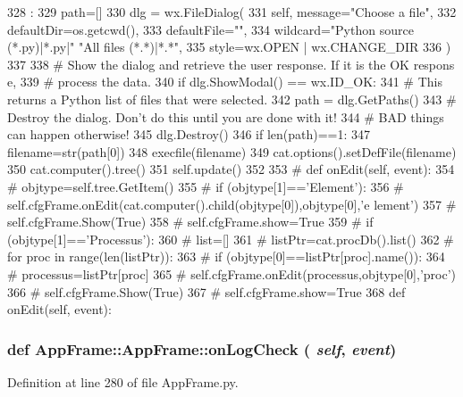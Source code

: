 \begin{DoxyCode}
328                            :
329         path=[]
330         dlg = wx.FileDialog(
331             self, message="Choose a file",
332             defaultDir=os.getcwd(), 
333             defaultFile="",
334             wildcard="Python source (*.py)|*.py|" "All files (*.*)|*.*",
335             style=wx.OPEN | wx.CHANGE_DIR
336             )
337 
338         # Show the dialog and retrieve the user response. If it is the OK respons
      e, 
339         # process the data.
340         if dlg.ShowModal() == wx.ID_OK:
341             # This returns a Python list of files that were selected.
342             path = dlg.GetPaths()
343         # Destroy the dialog. Don't do this until you are done with it!
344         # BAD things can happen otherwise!
345         dlg.Destroy()
346         if len(path)==1:
347             filename=str(path[0])
348             execfile(filename)
349             cat.options().setDefFile(filename)
350             cat.computer().tree()
351             self.update()
352             
353     # def onEdit(self, event):
354     #     objtype=self.tree.GetItem()
355     #     if (objtype[1]=='Element'):
356     #         self.cfgFrame.onEdit(cat.computer().child(objtype[0]),objtype[0],'e
      lement')
357     #         self.cfgFrame.Show(True)
358     #         self.cfgFrame.show=True            
359     #     if (objtype[1]=='Processus'):
360     #         list=[]
361     #         listPtr=cat.procDb().list()
362     #         for proc in range(len(listPtr)):
363     #             if (objtype[0]==listPtr[proc].name()):
364     #                 processus=listPtr[proc]
365     #         self.cfgFrame.onEdit(processus,objtype[0],'proc')
366     #         self.cfgFrame.Show(True)
367     #         self.cfgFrame.show=True            
368 
    def onEdit(self, event):
\end{DoxyCode}
\hypertarget{classAppFrame_1_1AppFrame_a5fc0d44cdfe82f731a9e8747c0062bdc}{
\subsubsection[{onLogCheck}]{\setlength{\rightskip}{0pt plus 5cm}def AppFrame::AppFrame::onLogCheck ( {\em self}, \/   {\em event})}}
\label{classAppFrame_1_1AppFrame_a5fc0d44cdfe82f731a9e8747c0062bdc}


Definition at line 280 of file AppFrame.py.


